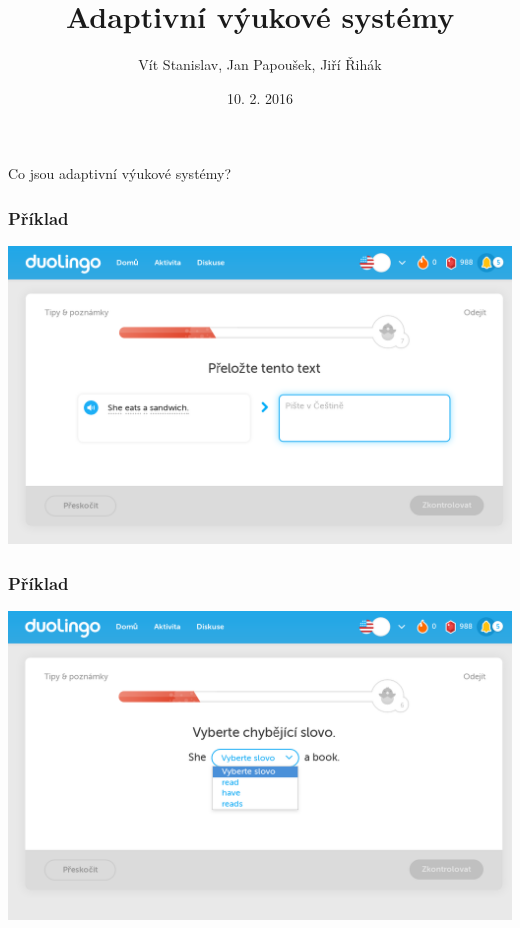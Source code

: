 \documentclass[xcolor=svgnames]{beamer}
\title[Adaptivní výukové systémy]{Adaptivní výukové systémy}
\author{Vít Stanislav, Jan Papoušek, Jiří Řihák}
\institute{Fakulta informatiky Masarykovy univerzity}      %
\date{10. 2. 2016}
\begin{document}
\frame[plain]{\titlepage}
\begin{frame}
  \huge{Co jsou adaptivní výukové systémy?}
\end{frame}
\begin{frame}
	\frametitle{Příklad}
   \includegraphics[width=\textwidth]{img/duolingo-practice}
\end{frame}
\begin{frame}
	\frametitle{Příklad}
   \includegraphics[width=\textwidth]{img/duolingo-practice-2}
\end{frame}
\end{document}
